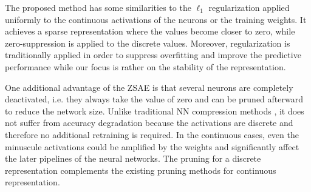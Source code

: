 The proposed method has some similarities to the $\ell_1$ regularization
applied uniformly to the continuous activations of the neurons or the training weights.
It achieves a sparse representation where the values become closer to zero,
while zero-suppression is applied to the discrete values.
% 
Moreover, regularization is traditionally applied in order to suppress overfitting and improve the predictive performance
while our focus is rather on the stability of the representation.
% 



One additional advantage of the ZSAE is that
several neurons are completely deactivated, i.e. they always take the value of zero
and can be pruned afterward to reduce the network size.
Unlike traditional NN compression methods \cite{cheng2017survey}, it does not suffer from
accuracy degradation because the activations are discrete and therefore no additional retraining is required.
In the continuous cases, even the minuscule activations could be amplified by the weights and significantly affect the
later pipelines of the neural networks.
The pruning for a discrete representation complements the existing pruning methods for continuous representation.

